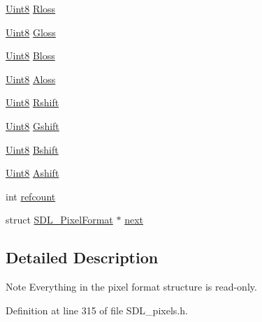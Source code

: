 \begin{DoxyCompactItemize}
\item 
\mbox{\hyperlink{_s_d_l__stdinc_8h_a2944638813a090aa23e62f4da842c3e2}{Uint8}} \mbox{\hyperlink{struct_s_d_l___pixel_format_a9994b4ed87a2551253aebfa191db8424}{Rloss}}
\item 
\mbox{\hyperlink{_s_d_l__stdinc_8h_a2944638813a090aa23e62f4da842c3e2}{Uint8}} \mbox{\hyperlink{struct_s_d_l___pixel_format_a94469768d8436e631a13d68623ff663f}{Gloss}}
\item 
\mbox{\hyperlink{_s_d_l__stdinc_8h_a2944638813a090aa23e62f4da842c3e2}{Uint8}} \mbox{\hyperlink{struct_s_d_l___pixel_format_a337072c1bc8b41efdd2da4e95b8c2ff7}{Bloss}}
\item 
\mbox{\hyperlink{_s_d_l__stdinc_8h_a2944638813a090aa23e62f4da842c3e2}{Uint8}} \mbox{\hyperlink{struct_s_d_l___pixel_format_a660e95097874088292f1289a458efaa2}{Aloss}}
\item 
\mbox{\hyperlink{_s_d_l__stdinc_8h_a2944638813a090aa23e62f4da842c3e2}{Uint8}} \mbox{\hyperlink{struct_s_d_l___pixel_format_abfdec7b9ee2ee39db630f4022e4e0daa}{Rshift}}
\item 
\mbox{\hyperlink{_s_d_l__stdinc_8h_a2944638813a090aa23e62f4da842c3e2}{Uint8}} \mbox{\hyperlink{struct_s_d_l___pixel_format_a6045012f994c02a86bdc4a91b28d2a3c}{Gshift}}
\item 
\mbox{\hyperlink{_s_d_l__stdinc_8h_a2944638813a090aa23e62f4da842c3e2}{Uint8}} \mbox{\hyperlink{struct_s_d_l___pixel_format_a4212574b67529628d8822ed4eb109754}{Bshift}}
\item 
\mbox{\hyperlink{_s_d_l__stdinc_8h_a2944638813a090aa23e62f4da842c3e2}{Uint8}} \mbox{\hyperlink{struct_s_d_l___pixel_format_ac3c4ffa0de1f2c94040340deede3bf46}{Ashift}}
\item 
int \mbox{\hyperlink{struct_s_d_l___pixel_format_a23be8060443d58064a720a4e2ef31729}{refcount}}
\item 
struct \mbox{\hyperlink{struct_s_d_l___pixel_format}{S\+D\+L\+\_\+\+Pixel\+Format}} $\ast$ \mbox{\hyperlink{struct_s_d_l___pixel_format_a1953b66c817116bf81bae4873ee6bce5}{next}}
\end{DoxyCompactItemize}


\subsection{Detailed Description}
\begin{DoxyNote}{Note}
Everything in the pixel format structure is read-\/only. 
\end{DoxyNote}


Definition at line 315 of file S\+D\+L\+\_\+pixels.\+h.



